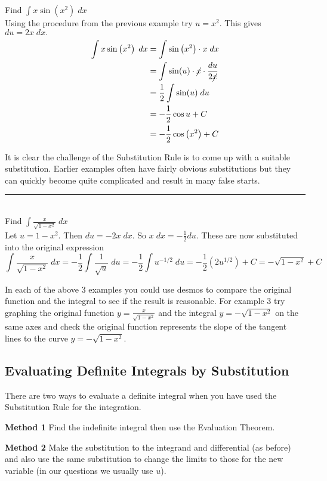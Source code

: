 \example Find $\int x \sin  \left (x^{2}\right )\; dx$\medskip\\
\solution Using the procedure from the previous example try $u =x^{2}$. This gives $d u =2 x\; d x\text{.}$
\begin{align*}\int x \sin  \left (x^{2}\right )\; d x &  = \int \sin  \left (x^{2}\right ) \cdot x\; d x \\
 &  = \int \sin(u) \cdot \cancel{x}\cdot\frac{du}{2\cancel{x}} \\
 &  = \frac{1}{2} \int \sin(u)\; d u \\
 &  =  -\frac{1}{2} \cos  u +C \\
 &  =  -\frac{1}{2} \cos  \left (x^{2}\right ) +C\end{align*}

It is clear the challenge of the Substitution Rule is to come up with a suitable substitution. Earlier examples often have fairly obvious substitutions but they can quickly become quite complicated and result in many false starts. \\
\rule{6.8cm}{0.5pt}\\
\example Find $\int \frac{x}{\sqrt{1 -x^{2}}}\; d x$\medskip\\
\solution Let $u =1 -x^{2}$. Then $d u = -2 x\; d x$. So $x\; d x = -\frac{1}{2} d u$. These are now substituted into the original expression
$$\int \frac{x}{\sqrt{1 -x^{2}}}\; d x = -\frac{1}{2} \int \frac{1}{\sqrt{u}}\; d u = -\frac{1}{2} \int u^{ -1/2}\; d u = -\frac{1}{2} \left (2 u^{1/2}\right ) +C = -\sqrt{1 -x^{2}} +C$$

In each of the above 3 examples you could use desmos to compare the original function and the integral to
see if the result is reasonable. For example 3 try graphing the original function $y =\frac{x}{\sqrt{1 -x^{2}}}$ and the integral $y = -\sqrt{1 -x^{2}}$ on the same axes and check the original function represents the slope of the tangent lines to the curve $y = -\sqrt{1 -x^{2}}$. 

\subsection*{Evaluating Definite Integrals by Substitution}
There are two ways to evaluate a definite integral when you have used the Substitution Rule for the integration. 

\textbf{Method 1} Find the indefinite integral then use the Evaluation Theorem. 

\textbf{Method 2} Make the substitution to the integrand and differential (as before) and also use the same substitution to change the limits to those for the new variable (in our questions we usually use $u$). 

